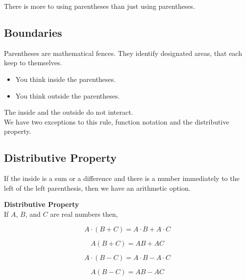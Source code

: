 \documentclass{ximera}
\begin{document}
There is more to using parentheses than just using parentheses. \\



\subsection*{Boundaries}


Parentheses are mathematical fences.  They identify designated areas, that each keep to themselves. \\

\begin{itemize}
\item You think inside the parentheses. 
\item You think outside the parentheses. 
\end{itemize}



The inside and the outside do not interact. \\


We have two exceptions to this rule, function notation and the distributive property. \\












\subsection*{Distributive Property}


If the inside is a sum or a difference and there is a number immediately to the left of the left parenthesis, then we have an arithmetic option.


\begin{notation}  \textbf{\textcolor{blue!55!black}{Distributive Property}} \\


If $A$, $B$, and $C$ are real numbers then,

\[
A \cdot (B + C) = A \cdot B + A \cdot C
\]


\[
A (B + C) = A  B + A  C
\]


\[
A \cdot (B - C) = A \cdot B - A \cdot C
\]


\[
A (B - C) = A  B - A  C
\]




\end{notation}
\end{document}
